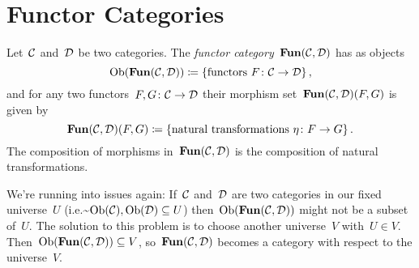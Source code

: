 \section{Functor Categories}


\begin{definition}
  Let~$\mathcal{C}$ and~$\mathcal{D}$ be two categories.
  The \emph{functor category}~$\mathbf{Fun}(\mathcal{C}, \mathcal{D})$ has as objects
  \[
              \operatorname{Ob}(\mathbf{Fun}(\mathcal{C}, \mathcal{D}))
    \coloneqq  \{
                \text{functors~$F \colon \mathcal{C} \to \mathcal{D}$}
              \} \,,
  \]
  and for any two functors~$F, G \colon \mathcal{C} \to \mathcal{D}$ their morphism set~$\mathbf{Fun}(\mathcal{C}, \mathcal{D})(F,G)$ is given by
  \[
              \mathbf{Fun}(\mathcal{C}, \mathcal{D})(F,G)
    \coloneqq  \{
                \text{natural transformations~$\eta \colon F \to G$}
              \} \,.
  \]
  The composition of morphisms in~$\mathbf{Fun}(\mathcal{C}, \mathcal{D})$ is the composition of natural transformations.
\end{definition}


\begin{remark}
  We’re running into  issues again:
  If~$\mathcal{C}$ and~$\mathcal{D}$ are two categories in our fixed universe~$U$ (i.e.\~$\operatorname{Ob}(\mathcal{C}), \operatorname{Ob}(\mathcal{D}) \subseteq U$) then~$\operatorname{Ob}(\mathbf{Fun}(\mathcal{C}, \mathcal{D}))$ might not be a subset of~$U$.
  The solution to this problem is to choose another universe~$V$ with~$U \in V$.
  Then~$\operatorname{Ob}(\mathbf{Fun}(\mathcal{C}, \mathcal{D})) \subseteq V$, so~$\mathbf{Fun}(\mathcal{C}, \mathcal{D})$ becomes a category with respect to the universe~$V$.
\end{remark}


